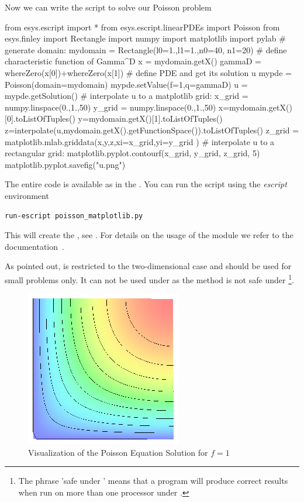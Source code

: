 Now we can write the script to solve our Poisson problem
\begin{python}
  from esys.escript import *
  from esys.escript.linearPDEs import Poisson
  from esys.finley import Rectangle
  import numpy
  import matplotlib
  import pylab
  # generate domain:
  mydomain = Rectangle(l0=1.,l1=1.,n0=40, n1=20)
  # define characteristic function of Gamma^D
  x = mydomain.getX()
  gammaD = whereZero(x[0])+whereZero(x[1])
  # define PDE and get its solution u
  mypde = Poisson(domain=mydomain)
  mypde.setValue(f=1,q=gammaD)
  u = mypde.getSolution()
  # interpolate u to a matplotlib grid:
  x_grid = numpy.linspace(0.,1.,50)
  y_grid = numpy.linspace(0.,1.,50)
  x=mydomain.getX()[0].toListOfTuples()
  y=mydomain.getX()[1].toListOfTuples()
  z=interpolate(u,mydomain.getX().getFunctionSpace()).toListOfTuples()
  z_grid = matplotlib.mlab.griddata(x,y,z,xi=x_grid,yi=y_grid )
  # interpolate u to a rectangular grid:
  matplotlib.pyplot.contourf(x_grid, y_grid, z_grid, 5)
  matplotlib.pyplot.savefig("u.png")
\end{python}
The entire code is available as  in the \ExampleDirectory.
You can run the script using the {\it escript} environment
\begin{verbatim}
run-escript poisson_matplotlib.py
\end{verbatim}
This will create the , see .
For details on the usage of the \MATPLOTLIB module we refer to the documentation~\cite{matplotlib}.

As pointed out, \MATPLOTLIB is restricted to the two-dimensional case and
should be used for small problems only.
It can not be used under \MPI as the  method is not
safe under \MPI\footnote{The phrase 'safe under \MPI' means that a program
will produce correct results when run on more than one processor under \MPI.}.

\begin{figure}
\centerline{\includegraphics[width=\figwidth]{FirstStepResult}}
\caption{Visualization of the Poisson Equation Solution for $f=1$}
\label{fig:FirstSteps.3}
\end{figure}

